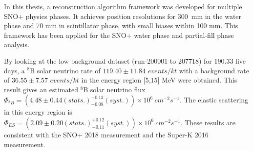 In this thesis, a reconstruction algorithm framework was developed for multiple SNO+ physics phases. It achieves position resolutions for 300~mm in the water phase and 70 mm in scintillator phase, with small biases within 100 mm. This framework has been applied for the SNO+ water phase and partial-fill phase analysis. 

By looking at the low background dataset (run-200001 to 207718) for 190.33 live days, a $^8$B solar neutrino rate of $119.40\pm11.84$ $events/kt$ with a background rate of $36.55\pm7.57$ $events/kt$ in the energy region [5,15] MeV were obtained. This result gives an estimated $^8$B solar neutrino flux $\Phi_{^8B}=(4.48 \pm 0.44(stats.)^{+0.13}_{-0.08}(syst.))\times10^6~cm^{-2}s^{-1}$. The elastic scattering in this energy region is $\Phi_{ES}=(2.09 \pm 0.20(stats.)^{+0.12}_{-0.11}(syst.))\times10^6~cm^{-2}s^{-1}$. These results are consistent with the SNO+ 2018 measurement\cite{anderson2019measurement} and the Super-K 2016 measurement\cite{abe2016solar}.